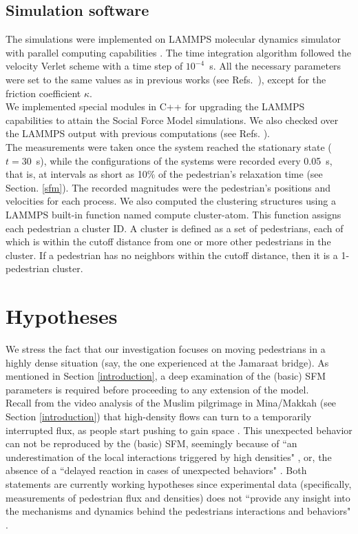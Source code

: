 \documentclass[preprint,12pt]{elsarticle}
\begin{document}
\subsection{\label{software} Simulation software}

The simulations were implemented on LAMMPS molecular dynamics 
simulator with parallel computing capabilities \cite{plimpton}. The time 
integration algorithm followed the velocity Verlet scheme with a time step of 
$10^{-4}$~s. All the necessary parameters were set to the same values as in 
previous works (see Refs.~\cite{Dorso5,sticco}), except for the friction 
coefficient $\kappa$. \\

We implemented special modules in C++ for upgrading the LAMMPS 
capabilities to attain the Social Force Model simulations. We also checked over 
the LAMMPS output with previous computations (see Refs. \cite{Dorso2, 
Dorso1,Dorso3, Dorso4,Dorso6}).\\

The measurements were taken once the system reached the 
stationary state ($t=30$~s), while the configurations of the systems were 
recorded every 0.05~s, that is, at intervals as short as 10\% of the 
pedestrian’s relaxation time (see Section. \ref{sfm}). The recorded magnitudes 
were the pedestrian’s positions and velocities for each process. We also 
computed the clustering structures using a LAMMPS built-in function 
named compute cluster-atom. This function assigns each pedestrian a cluster ID.
A cluster is defined as a set of pedestrians, each of which is within the cutoff
distance from one or more other pedestrians in the cluster. 
If a pedestrian has no neighbors within the cutoff distance, then it is a 1-pedestrian cluster.\\




\section{\label{Hypotheses} Hypotheses}

We stress the fact that our investigation focuses on moving
pedestrians in a highly dense situation (say, the one experienced at
the Jamaraat bridge). As mentioned in Section \ref{introduction}, a deep
examination of the (basic) SFM parameters is required before
proceeding to any extension of the model.\\

Recall from the video analysis of the Muslim pilgrimage in Mina/Makkah
(see Section \ref{introduction}) that high-density flows can turn to a
temporarily interrupted flux, as people
start pushing to gain space \cite{helbing3}. This unexpected behavior can not be
reproduced by the (basic) SFM, seemingly because of ``an
underestimation of the local interactions triggered by high densities"
\cite{yu1}, or, the absence of a ``delayed reaction in cases of unexpected
behaviors" \cite{johansson}. Both statements are currently working hypotheses since
experimental data (specifically, measurements of pedestrian flux and
densities) does not ``provide any insight into the mechanisms and
dynamics behind the pedestrians interactions and behaviors" \cite{johansson}.\\
\end{document}

